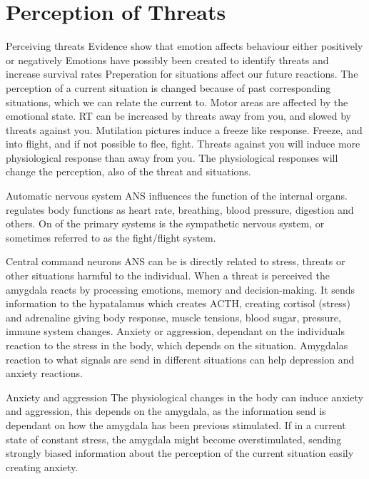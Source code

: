 \section{Perception of Threats} \label{perception}

Perceiving threats
	Evidence show that emotion affects behaviour either positively or negatively
	Emotions have possibly been created to identify threats and increase survival rates
	Preperation for situations affect our future reactions. The perception of a current situation is changed because of past corresponding situations, which we can relate the current to.
	Motor areas are affected by the emotional state.
	RT can be increased by threats away from you, and slowed by threats against you. Mutilation pictures induce a freeze like response. Freeze, and into flight, and if not possible to flee, fight.
	Threats against you will induce more physiological response than away from you.
	The physiological responses will change the perception, also of the threat and situations.
	\cite{How you perceive threat determines your behavior}

Automatic nervous system
	ANS influences the function of the internal organs. regulates body functions as heart rate, breathing, blood pressure, digestion and others. On of the primary systems is the sympathetic nervous system, or sometimes referred to as the fight/flight system. 	\cite{Pocock, Gillian (2006). Human Physiology (3rd ed.). Oxford University Press.}

Central command neurons
	ANS can be is directly related to stress, threats or other situations harmful to the individual.
	When a threat is perceived the amygdala reacts by processing emotions, memory and decision-making. It sends information to the hypatalamus which creates ACTH, creating cortisol (stress) and adrenaline giving body response, muscle tensions, blood sugar, pressure, immune system changes. Anxiety or aggression, dependant on the individuals reaction to the stress in the body, which depends on the situation. Amygdalas reaction to what signals are send in different situations can help depression and anxiety reactions.
	\cite{Perspectives in the Management of Anxiety Disorders} \cite{Central Command Neurons of the Sympathetic Nervous System: Basis of the Fight-or-Flight Response}
	
Anxiety and aggression
	The physiological changes in the body can induce anxiety and aggression, this depends on the amygdala, as the information send is dependant on how the amygdala has been previous stimulated. If in a current state of constant stress, the amygdala might become overstimulated, sending strongly biased information about the perception of the current situation easily creating anxiety. 	\cite{How you perceive threat determines your behavior}